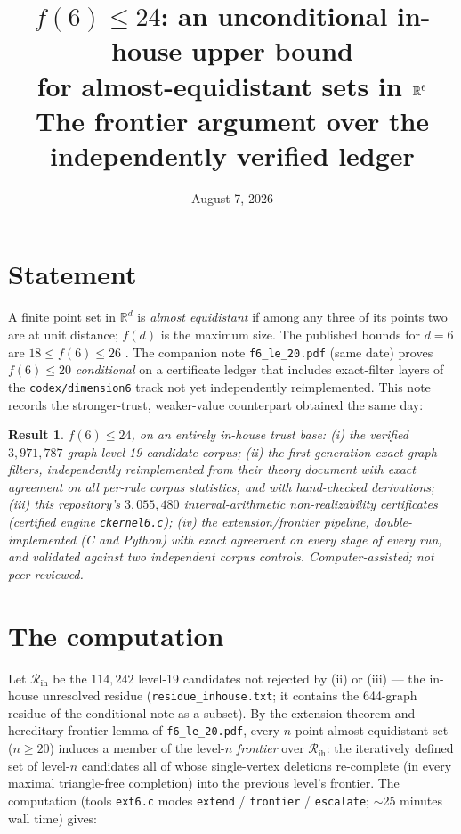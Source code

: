 \documentclass[11pt]{article}
\title{\vspace{-1.2cm}$f(6)\le 24$: an unconditional in-house upper bound\\
for almost-equidistant sets in $\R^6$\\[4pt]
\large The frontier argument over the independently verified ledger}
\author{}
\date{August 7, 2026}
\newtheorem*{result}{Result}
\newcommand{\R}{\mathbb{R}}
\begin{document}
\maketitle
\vspace{-1.4cm}

\section*{Statement}

A finite point set in $\R^d$ is \emph{almost equidistant} if among any
three of its points two are at unit distance; $f(d)$ is the maximum
size. The published bounds for $d=6$ are $18\le f(6)\le 26$
\cite{BPSSV}. The companion note \texttt{f6\_le\_20.pdf} (same date)
proves $f(6)\le 20$ \emph{conditional} on a certificate ledger that
includes exact-filter layers of the \texttt{codex/dimension6} track not
yet independently reimplemented. This note records the stronger-trust,
weaker-value counterpart obtained the same day:

\begin{result}
$f(6)\le 24$, on an entirely in-house trust base: (i) the verified
$3{,}971{,}787$-graph level-19 candidate corpus; (ii) the
first-generation exact graph filters, independently reimplemented from
their theory document with exact agreement on all per-rule corpus
statistics, and with hand-checked derivations; (iii) this repository's
$3{,}055{,}480$ interval-arithmetic non-realizability certificates
(certified engine \texttt{ckernel6.c}); (iv) the extension/frontier
pipeline, double-implemented (C and Python) with exact agreement on
every stage of every run, and validated against two independent corpus
controls. Computer-assisted; not peer-reviewed.
\end{result}

\section*{The computation}

Let $\mathcal R_{\mathrm{ih}}$ be the $114{,}242$ level-19 candidates
not rejected by (ii) or (iii) — the in-house unresolved residue
(\texttt{residue\_inhouse.txt}; it contains the 644-graph residue of the
conditional note as a subset). By the extension theorem and hereditary
frontier lemma of \texttt{f6\_le\_20.pdf}, every $n$-point
almost-equidistant set ($n\ge 20$) induces a member of the level-$n$
\emph{frontier} over $\mathcal R_{\mathrm{ih}}$: the iteratively defined
set of level-$n$ candidates all of whose single-vertex deletions
re-complete (in every maximal triangle-free completion) into the
previous level's frontier. The computation (tools \texttt{ext6.c}
modes \texttt{extend} / \texttt{frontier} / \texttt{escalate};
$\sim$25 minutes wall time) gives:
\end{document}
